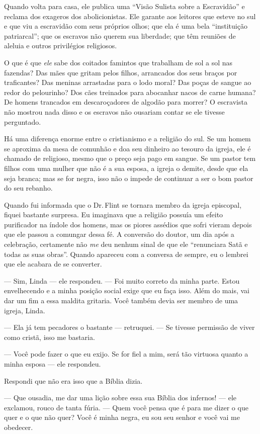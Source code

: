 Quando volta para casa, ele publica uma ``Visão Sulista sobre a
Escravidão'' e reclama dos exageros dos abolicionistas. Ele garante aos
leitores que esteve no sul e que viu a escravidão com seus próprios
olhos; que ela é uma bela ``instituição patriarcal''; que os escravos
não querem sua liberdade; que têm reuniões de aleluia e outros
privilégios religiosos.

O que é que \emph{ele} sabe dos
coitados famintos que trabalham de sol a sol nas fazendas? Das mães que
gritam pelos filhos, arrancados dos seus braços por traficantes? Das
meninas arrastadas para o lodo moral? Das poças de sangue ao redor do
pelourinho? Dos cães treinados para abocanhar nacos de carne humana? De
homens trancados em descaroçadores de algodão para morrer? O escravista
não mostrou nada disso e os escravos não ousariam contar se ele tivesse
perguntado.

Há
uma diferença enorme entre o cristianismo e a religião do sul. Se um
homem se aproxima da mesa de comunhão e doa seu dinheiro ao tesouro da
igreja, ele é chamado de religioso, mesmo que o preço seja pago em
sangue. Se um pastor tem filhos com uma mulher que não é a sua esposa, a
igreja o demite, desde que ela seja branca; mas se for negra, isso não o
impede de continuar a ser o bom pastor do seu rebanho.

Quando fui informada que o Dr.\,Flint se
tornara membro da igreja episcopal, fiquei bastante surpresa. Eu
imaginava que a religião possuía um efeito purificador na índole dos
homens, mas os piores assédios que sofri vieram depois que ele passou a
comungar dessa fé. A conversão do doutor, um dia após a celebração,
certamente não \emph{me} deu nenhum sinal de que ele ``renunciara Satã e
todas as suas obras''. Quando apareceu com a conversa de sempre, eu o
lembrei que ele acabara de se converter.

--- Sim, Linda --- ele respondeu. --- Foi muito correto da minha parte.
Estou envelhecendo e a minha posição social exige que eu faça isso. Além
do mais, vai dar um fim a essa maldita gritaria. Você também devia ser
membro de uma igreja, Linda.

--- Ela já tem pecadores o bastante ---
retruquei. --- Se tivesse permissão de viver como cristã, isso me
bastaria.

--- Você pode fazer o que eu exijo. Se
for fiel a mim, será tão virtuosa quanto a minha esposa --- ele
respondeu.

Respondi que não era isso que a Bíblia
dizia.

--- Que ousadia, me dar uma lição sobre
essa sua Bíblia dos infernos! --- ele exclamou, rouco de tanta fúria.
--- Quem você pensa que é para me dizer o que quer e o que não quer?
Você é minha negra, eu sou seu senhor e você vai me obedecer.


